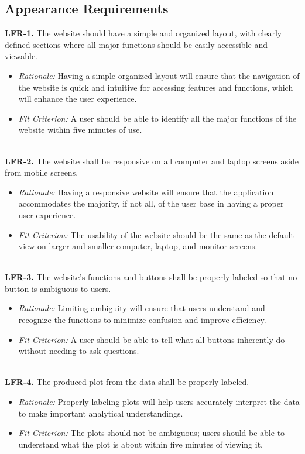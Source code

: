 \documentclass[12pt]{article}
\begin{document}
\subsection{Appearance Requirements}
\textbf{LFR-1.} The website should have a simple and organized layout, with
  clearly defined sections where all major functions should be easily accessible
  and viewable.
  \begin{itemize}
    \item \textit{Rationale:} Having a simple organized layout will ensure that the
    navigation of the website is quick and intuitive for accessing features and
    functions, which will enhance the user experience.
    \item \textit{Fit Criterion:} A user should be able to identify all the major
    functions of the website within five minutes of use.
  \end{itemize}
\ \\
\textbf{LFR-2.} The website shall be responsive on all computer and laptop screens
  aside from mobile screens.
  \begin{itemize}
    \item \textit{Rationale:} Having a responsive website will ensure that the
    application accommodates the majority, if not all, of the user base in having a
    proper user experience. 
    \item \textit{Fit Criterion:} The usability of the website should be the same
    as the default view on larger and smaller computer, laptop, and monitor screens.
  \end{itemize}
\ \\
\textbf{LFR-3.} The website's functions and buttons shall be properly labeled
  so that no button is ambiguous to users.
  \begin{itemize}
    \item \textit{Rationale:} Limiting ambiguity will ensure that users
    understand and recognize the functions to minimize confusion and improve
    efficiency.
    \item \textit{Fit Criterion:} A user should be able to tell what all buttons
    inherently do without needing to ask questions.
  \end{itemize}
\ \\
\textbf{LFR-4.} The produced plot from the data shall be properly labeled.
  \begin{itemize}
    \item \textit{Rationale:} Properly labeling plots will help users
    accurately interpret the data to make important analytical understandings.
    \item \textit{Fit Criterion:} The plots should not be ambiguous; users
    should be able to understand what the plot is about within five minutes of
    viewing it.
  \end{itemize}
\end{document}
